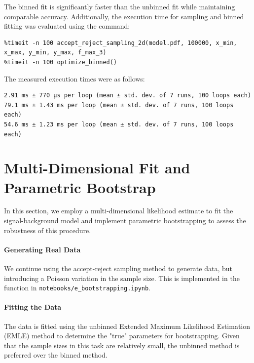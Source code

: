\documentclass{article}
\begin{document}
The binned fit is significantly faster than the unbinned fit while maintaining comparable accuracy. Additionally, the execution time for sampling and binned fitting was evaluated using the  command:

\begin{lstlisting}[style=pythonstyle]
%timeit -n 100 np.random.normal(size=100000) # benchmark
%timeit -n 100 accept_reject_sampling_2d(model.pdf, 100000, x_min, x_max, y_min, y_max, f_max_3)
%timeit -n 100 optimize_binned()
\end{lstlisting}

The measured execution times were as follows:

\begin{lstlisting}[style=input]
2.91 ms ± 770 μs per loop (mean ± std. dev. of 7 runs, 100 loops each)
79.1 ms ± 1.43 ms per loop (mean ± std. dev. of 7 runs, 100 loops each)
54.6 ms ± 1.23 ms per loop (mean ± std. dev. of 7 runs, 100 loops each)
\end{lstlisting}


\section{Multi-Dimensional Fit and Parametric Bootstrap}
\label{sec:pbe}

In this section, we employ a multi-dimensional likelihood estimate to fit the signal-background model and implement parametric bootstrapping to assess the robustness of this procedure.


\paragraph{Generating Real Data}
We continue using the accept-reject sampling method to generate data, but introducing a Poisson variation in the sample size. This is implemented in the function  in \texttt{notebooks/e\_bootstrapping.ipynb}.



\paragraph{Fitting the Data}
The data is fitted using the unbinned Extended Maximum Likelihood Estimation (EMLE) method to determine the "true" parameters for bootstrapping. Given that the sample sizes in this task are relatively small, the unbinned method is preferred over the binned method.
\end{document}
